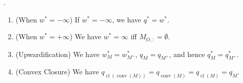 \begin{lemm}.
	\label{lemm:031-direct-consequences}
	\begin{enumerate}[label=(\alph*)]
		\item (When $w^\ast=-\infty$) If $w^\ast=-\infty$, we have $q^\ast=w^\ast$.
		\item (When $w^\ast=+\infty$) We have $w^\ast=\infty$ iff $M_{O,:}=\emptyset$.
		\item (Upwardification) We have $w_M^\ast=w_{M^+}^\ast$, $q_M=q_{M^+}$, and hence $q_M^\ast=q_{M^+}^\ast$.
		\item (Convex Closure) We have $q_{\operatorname{cl}(\operatorname{conv}(M))}=q_{\operatorname{conv}(M)}=q_{\operatorname{cl}(M)}=q_M$.
	\end{enumerate}
\end{lemm}


